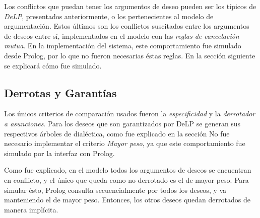 \documentclass[oneside]{book}
\theoremstyle{definition}
\theoremstyle{example}
\begin{document}
Los conflictos que puedan tener los argumentos de deseo pueden ser los típicos de \textit{DeLP},
presentados anteriormente, o
los pertenecientes al modelo de argumentación. Estos últimos son los conflictos suscitados entre 
los argumentos de deseos entre sí, implementados en el modelo con las \textit{reglas de cancelación
mutua}. En la implementación del sistema, este comportamiento fue simulado desde Prolog, por lo que 
no fueron necesarias éstas reglas. En la sección siguiente se explicará cómo fue simulado.

\subsection{Derrotas y Garantías}

Los únicos criterios de comparación usados fueron la \textit{especificidad} y la \textit{derrotador a 
asunciones}. Para los deseos que son garantizados por DeLP se generan sus respectivos árboles de dialéctica, como 
fue explicado en la sección %
No fue necesario implementar el criterio \textit{Mayor peso}, ya que este comportamiento
fue simulado por la interfaz con Prolog.

Como fue explicado, en el modelo todos los argumentos de deseos se encuentran en conflicto, y el 
único que queda como no derrotado es el de mayor peso. Para simular ésto, Prolog consulta 
secuencialmente por todos los deseos, y va manteniendo el de mayor peso. Entonces, los otros deseos
quedan derrotados de manera implícita.
\end{document}
